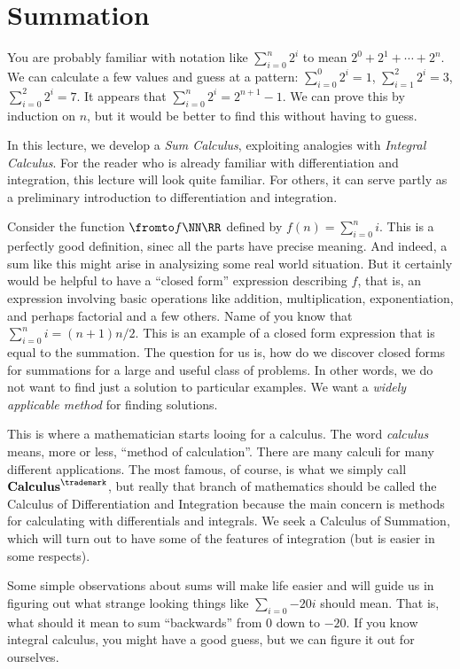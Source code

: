 \chapter{Summation}

You are probably familiar with notation like $\sum_{i=0}^n 2^i$ to mean $2^0 + 2^1 + \dotsb + 2^n$. We can calculate a few values and guess at a pattern: $\sum_{i=0}^0 2^i= 1$, $\sum_{i=1}^2 2^i = 3$, $\sum_{i=0}^{2}2^i = 7$. It appears that $\sum_{i=0}^n 2^i = 2^{n+1}-1$. We can prove this by induction on $n$, but it would be better to find this without having to guess.

In this lecture, we develop a \emph{Sum Calculus}, exploiting analogies with \emph{Integral Calculus}. For the reader who is already familiar with differentiation and integration, this lecture will look quite familiar. For others, it can serve partly as a preliminary introduction to differentiation and integration.

Consider the function $\fromto f\NN\RR$ defined by $f(n) = \sum_{i=0}^n i$. 
This is a perfectly good definition, sinec all the parts have precise meaning. 
And indeed, a sum like this might arise in analysizing some real world situation. 
But it certainly would be helpful to have a ``closed form'' expression describing $f$, that is, an expression involving basic operations like addition, multiplication, exponentiation, and perhaps factorial and a few others.
Name of you know that $\sum_{i=0}^n i = (n+1)n/2$. 
This is an example of a closed form expression that is equal to the summation. 
The question for us is, how do we discover closed forms for summations for a large and useful class of problems. 
In other words, we do not want to find just a solution to particular examples. 
We want a \emph{widely applicable method} for finding solutions.

This is where a mathematician starts looing for a calculus. The word \emph{calculus} means, more or less, ``method of calculation''. There are many calculi for many different applications. The most famous, of course, is what we simply call $\textbf{Calculus}^{\trademark}$, but really that branch of mathematics should be called the Calculus of Differentiation and Integration because the main concern is methods for calculating with differentials and integrals. We seek a Calculus of Summation, which will turn out to have some of the features of integration (but is easier in some respects).

Some simple observations about sums will make life easier and will guide us in figuring out what strange looking things like $\sum_{i=0}{-20} i$ should mean. That is, what should it mean to sum ``backwards'' from $0$ down to $-20$. If you know integral calculus, you might have a good guess, but we can figure it out for ourselves.


